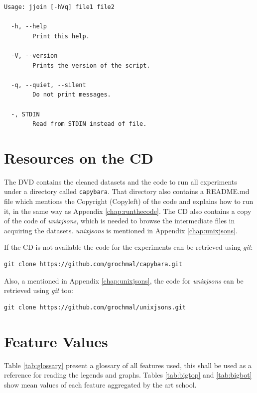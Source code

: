 \documentclass[11pt,a4paper,draft]{report}
\begin{document}
{\small
\begin{Verbatim}[samepage=true]
Usage: jjoin [-hVq] file1 file2

  -h, --help
        Print this help.

  -V, --version
        Prints the version of the script.

  -q, --quiet, --silent
        Do not print messages.

  -, STDIN
        Read from STDIN instead of file.
\end{Verbatim}
}

\chapter{Resources on the CD}
\label{chap:resources}

The DVD contains the cleaned datasets and the code to run all experiments under
a directory called \texttt{capybara}.  That directory also contains a README.md
file which mentions the Copyright (Copyleft) of the code and explains how to
run it, in the same way as Appendix \ref{chap:runthecode}.  The CD also
contains a copy of the code of \emph{unixjsons}, which is needed to browse the
intermediate files in acquiring the datasets.  \emph{unixjsons} is mentioned in
Appendix \ref{chap:unixjsons}.

If the CD is not available the code for the experiments can be retrieved using
\emph{git}:

\begin{verbatim}
git clone https://github.com/grochmal/capybara.git
\end{verbatim}

Also, a mentioned in Appendix \ref{chap:unixjsons}, the code for
\emph{unixjsons} can be retrieved using \emph{git} too:

\begin{verbatim}
git clone https://github.com/grochmal/unixjsons.git
\end{verbatim}

\newpage
\null
\thispagestyle{empty}
\newpage

\chapter{Feature Values}
\label{chap:glossary}

Table \ref{tab:glossary} present a glossary of all features used, this shall be
used as a reference for reading the legends and graphs.  Tables
\ref{tab:bigtop} and \ref{tab:bigbot} show mean values of each feature
aggregated by the art school.
\end{document}
